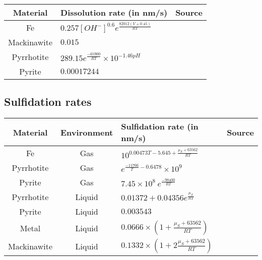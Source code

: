 \documentclass{article}
\begin{document}
\begin{center}
    \begin{tabular}{ | c | p{8cm} | c |}
    \hline
    Material & Dissolution rate (in nm/s) & Source \\

    \hline
    Fe & $0.257 [OH^-]^{0.6} e^{\frac{82012(V+0.45)}{R T}}$ & \cite{EKASRC72} \\

    \hline
    Mackinawite & $0.015$ & \cite{CMESLS08} \\

    \hline
    Pyrrhotite & $289.15 e^{\frac{-65900}{R T}} \times 10^{-1.46 pH}$ & \cite{PDAMPC14} \\

    \hline
    Pyrite & $0.00017244$ & \cite{ISACMP08} \\

    \hline

    \end{tabular}
\end{center}






\subsection{Sulfidation rates}


\begin{center}
    \begin{tabular}{ | c | c | p{8cm} | c |}
    \hline
    Material & Environment & Sulfidation rate (in nm/s) & Source \\

    \hline
    Fe & Gas & $ 10^{0.00473 T - 5.645 + \frac{\mu_S+63562}{R T}}   $ & \cite{ACPPRJ04} \\

    \hline
    Pyrrhotite & Gas & $e^{\frac{-11766}{T} - 0.6478} \times 10^{9}$ & \cite{MGISFH15} \\

    \hline
    Pyrite & Gas & $7.45 \times 10^8 \ e^{\frac{-98400}{R T}}$ & \cite{KOGSRP03} \\

    \hline
    Pyrrhotite & Liquid & $0.01372 + 0.04356 e^{\frac{\mu_S}{R T}}$ & \cite{COAETR90} \\

    \hline
    Pyrite & Liquid & $0.003543$ & \cite{CGOCNH98} \\

    \hline
    Metal & Liquid & $0.0666 \times \left(1 + \frac{\mu_S+63562}{R T}\right)$ & \cite{KOHCWS06} \\

    \hline
    Mackinawite & Liquid & $0.1332 \times \left(1 + 2 \frac{\mu_S+63562}{R T}\right)$ & \cite{MMMSWS07} \\

    \hline

    \end{tabular}
\end{center}







\end{document}
